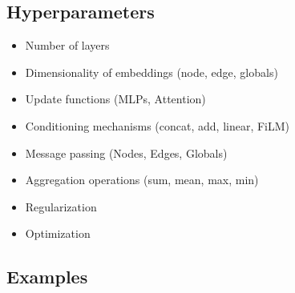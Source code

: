 \subsection{Hyperparameters}
\begin{notes}
    \begin{itemize}
        \item Number of layers
        \item Dimensionality of embeddings (node, edge, globals)
        \item Update functions (MLPs, Attention)
        \item Conditioning mechanisms (concat, add, linear, FiLM)
        \item Message passing (Nodes, Edges, Globals)
        \item Aggregation operations (sum, mean, max, min)
        \item Regularization
        \item Optimization
    \end{itemize}
\end{notes}
\newpage

\subsection{Examples}

